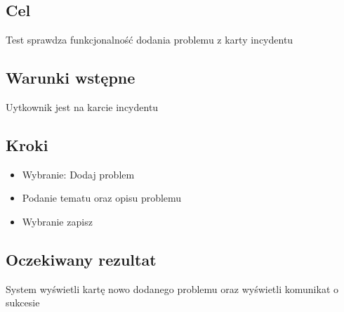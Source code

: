 \documentclass[a4paper, oneside, 11pt]{report}
\begin{document}
\subsection*{Cel}
Test sprawdza funkcjonalność dodania problemu z karty incydentu
\subsection*{Warunki wstępne}
Uytkownik jest na karcie incydentu
\subsection*{Kroki}
\begin{itemize}
	\item Wybranie: Dodaj problem
	\item Podanie tematu oraz opisu problemu
	\item Wybranie zapisz
\end{itemize}
\subsection*{Oczekiwany rezultat}
System wyświetli kartę nowo dodanego problemu oraz wyświetli komunikat o sukcesie


\end{document}

